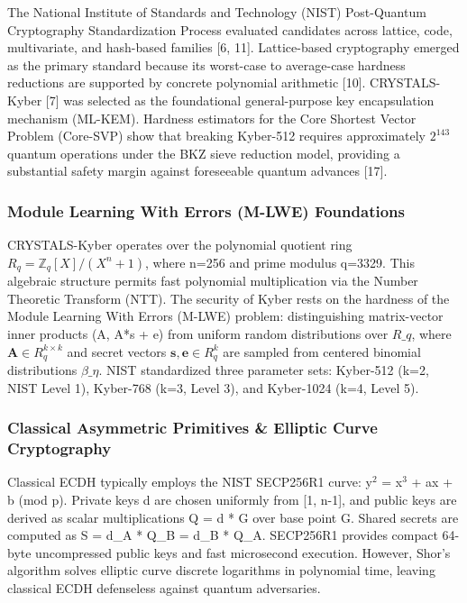 \documentclass[5p,times]{elsarticle}
\begin{document}
The National Institute of Standards and Technology (NIST) Post-Quantum Cryptography Standardization Process evaluated candidates across lattice, code, multivariate, and hash-based families [6, 11]. Lattice-based cryptography emerged as the primary standard because its worst-case to average-case hardness reductions are supported by concrete polynomial arithmetic [10]. CRYSTALS-Kyber [7] was selected as the foundational general-purpose key encapsulation mechanism (ML-KEM). Hardness estimators for the Core Shortest Vector Problem (Core-SVP) show that breaking Kyber-512 requires approximately $2^{143}$ quantum operations under the BKZ sieve reduction model, providing a substantial safety margin against foreseeable quantum advances [17].


\subsubsection{Module Learning With Errors (M-LWE) Foundations}

CRYSTALS-Kyber operates over the polynomial quotient ring $R_q = \mathbb{Z}_q[X]/(X^n + 1)$, where n=256 and prime modulus q=3329. This algebraic structure permits fast polynomial multiplication via the Number Theoretic Transform (NTT). The security of Kyber rests on the hardness of the Module Learning With Errors (M-LWE) problem: distinguishing matrix-vector inner products (A, A*s + e) from uniform random distributions over $R\_q$, where $\mathbf{A} \in R_q^{k \times k}$ and secret vectors $\mathbf{s}, \mathbf{e} \in R_q^k$ are sampled from centered binomial distributions $\beta\_\eta$. NIST standardized three parameter sets: Kyber-512 (k=2, NIST Level 1), Kyber-768 (k=3, Level 3), and Kyber-1024 (k=4, Level 5).


\subsubsection{Classical Asymmetric Primitives \& Elliptic Curve Cryptography}

Classical ECDH typically employs the NIST SECP256R1 curve: y$^2$ = x$^3$ + ax + b (mod p). Private keys d are chosen uniformly from [1, n-1], and public keys are derived as scalar multiplications Q = d * G over base point G. Shared secrets are computed as S = d\_A * Q\_B = d\_B * Q\_A. SECP256R1 provides compact 64-byte uncompressed public keys and fast microsecond execution. However, Shor's algorithm solves elliptic curve discrete logarithms in polynomial time, leaving classical ECDH defenseless against quantum adversaries.
\end{document}
